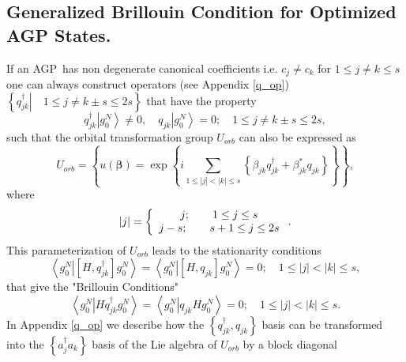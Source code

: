 \documentclass[aps,preprint]{revtex4}%
\begin{document}
\subsection{Generalized Brillouin Condition for Optimized AGP
States.\label{Brillouin}}

If an AGP\ has non degenerate canonical coefficients i.e. $c_{j}\neq c_{k}$
for $1\leq j\neq k\leq s$ one can \cite{weiner_ad_04}\cite{Weiner83a}%
\cite{Kurtz83} always construct operators (see Appendix \ref{q_op}) $\left\{
\left.  q_{jk}^{\dagger}\right\vert \quad1\leq j\neq k\pm s\leq2s\right\}  $
that have the property
\begin{equation}
q_{jk}^{\dagger}\left\vert g_{0}^{N}\right\rangle \neq0,\quad q_{jk}\left\vert
g_{0}^{N}\right\rangle =0;\quad1\leq j\neq k\pm s\leq2s,
\end{equation}
such that the orbital transformation group $U_{orb}$ can also be expressed as
\begin{equation}
U_{orb}=\left\{  u\left(  \mathbf{\beta}\right)  =\exp\left\{  i\sum
_{1\leq\left\vert j\right\vert <\left\vert k\right\vert \leq s}\left\{
\beta_{jk}q_{jk}^{\dagger}+\beta_{jk}^{\ast}q_{jk}\right\}  \right\}
\right\}  ,
\end{equation}
where
\begin{equation}
\left\vert j\right\vert =\left\{
\begin{array}
[c]{c}%
j;\qquad1\leq j\leq s\\
j-s;\qquad s+1\leq j\leq2s
\end{array}
\right.  .
\end{equation}
This parameterization of $U_{orb}$ leads to the stationarity conditions
\begin{equation}
\left\langle \left.  g_{0}^{N}\right\vert \left[  H,q_{jk}^{\dagger}\right]
g_{0}^{N}\right\rangle =\left\langle \left.  g_{0}^{N}\right\vert \left[
H,q_{jk}\right]  g_{0}^{N}\right\rangle =0;\quad1\leq\left\vert j\right\vert
<\left\vert k\right\vert \leq s,
\end{equation}
that give the "Brillouin Conditions"
\begin{equation}
\left\langle \left.  g_{0}^{N}\right\vert Hq_{jk}^{\dagger}g_{0}%
^{N}\right\rangle =\left\langle \left.  g_{0}^{N}\right\vert q_{jk}Hg_{0}%
^{N}\right\rangle =0;\quad1\leq\left\vert j\right\vert <\left\vert
k\right\vert \leq s.\label{BC}%
\end{equation}
In Appendix \ref{q_op} we describe how the $\left\{  q_{jk}^{\dagger}%
,q_{jk}\right\}  $ basis can be transformed into the $\left\{  a_{j}^{\dagger
}a_{k}\right\}  $ basis of the Lie algebra of $U_{orb}$ by a block diagonal
\end{document}
